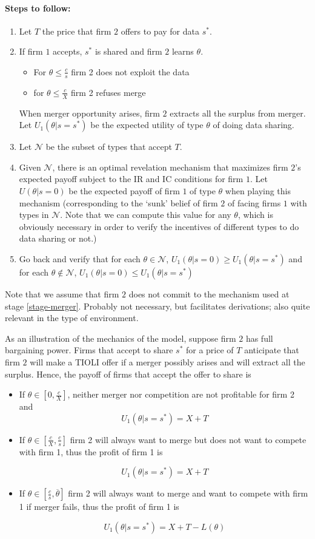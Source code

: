 \documentclass[a4paper]{article}
\newcommand{\N}{\mathcal N}
\renewcommand{\t}{\theta}
\begin{document}
\paragraph{Steps to follow:}
\begin{enumerate}[(1)]\setlength\itemsep{0em}
  \item Let $T$ the price that firm $2$ offers to pay for data $s^*$.
  \item If firm $1$ accepts, $s^*$ is shared and firm $2$ learns $\t$. 
  \begin{itemize}
      \item For $\t \leq \frac{c}{s}$ firm 2 does not exploit the data
      \item for $\t \leq \frac{c}{X}$ firm 2 refuses merge
  \end{itemize}  When merger opportunity arises, firm $2$ extracts all the surplus from merger. Let $U_1(\t|s=s^*)$ be the expected utility of type $\t$ of doing data sharing.
  \item Let $\N$ be the subset of types that accept $T$.
  \item\label{stage-merger} Given $\N$, there is an optimal revelation mechanism that maximizes firm $2$'s expected payoff subject to the IR and IC conditions for firm $1$. Let $U(\t|s=0)$ be the expected payoff of firm $1$ of type $\t$ when playing this mechanism (corresponding to the `sunk' belief of firm $2$ of facing firms $1$ with types in $\N$. Note that we can compute this value for any $\t$, which is obviously necessary in order to verify the incentives of different types to do data sharing or not.)
  \item Go back and verify that for each $\t\in \N$, $U_1(\t|s=0)\geq U_1(\t|s=s^*)$ and for each $\t\notin \N$, $U_1(\t|s=0)\leq U_1(\t|s=s^*)$
\end{enumerate}
%
Note that we assume that firm $2$ does not commit to the mechanism used at stage \eqref{stage-merger}. Probably not necessary, but facilitates derivations; also quite relevant in the \cite{anton2002sale} type of environment.

As an illustration of the mechanics of the model, suppose firm $2$ has full bargaining power. Firms that accept to share $s^*$ for a price of $T$ anticipate that firm $2$ will make a TIOLI offer if a merger possibly arises and will extract all the surplus. Hence, the payoff of firms that accept the offer to share is   
%

\begin{itemize}
    \item If $\t\in[0,\frac{c}{X}]$, neither merger nor competition are not profitable for firm 2 and
    \[U_1(\t|s=s^*)=X+T\]
    \item If $\t\in[\frac{c}{X},\frac{c}{s}]$ firm 2 will always want to merge but does not want to compete with firm 1, thus the profit of firm 1 is
    
    \[U_1(\t|s=s^*)=X+T\]
    \item If $\t\in[\frac{c}{s},\overline \t]$ firm 2 will always want to merge and want to compete with firm 1 if merger fails, thus the profit of firm 1 is
    
    \[U_1(\t|s=s^*)=X+T-L(\t)\]
\end{itemize}
\end{document}
